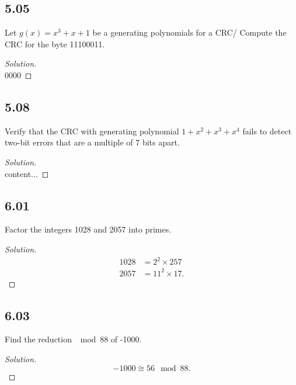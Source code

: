 \documentclass[]{article}
\newcommand\<{\langle}
\renewcommand\>{\rangle}
\newenvironment{solution}
{
	\begin{proof}[Solution] \text{ }
		\\
	}
	{
	\end{proof}
}
\begin{document}
\subsection*{5.05} Let $g(x) = x^3 + x + 1$ be a generating polynomials for a CRC/ Compute the CRC for the byte 11100011.
\begin{solution}
	0000
\end{solution}

\subsection*{5.08} Verify that the CRC with generating polynomial $1 + x^2 + x^3 + x^4$ fails to detect two-bit errors that are a multiple of 7 bits apart.
\begin{solution}
	content...
\end{solution}

\subsection*{6.01} Factor the integers 1028 and 2057 into primes.
\begin{solution}
	\begin{align*}
		1028 &= 2^2 \times 257 \\
		2057 &= 11^2 \times 17.
	\end{align*}
\end{solution}

\subsection*{6.03} Find the reduction $\mod 88$ of -1000.
\begin{solution}
	$$
		-1000 \cong 56 \mod 88.
	$$
\end{solution}
\end{document}
